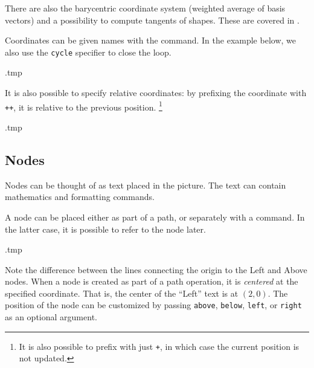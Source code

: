 There are also the barycentric coordinate system (weighted average of basis vectors)
and a possibility to compute tangents of shapes.
These are covered in \cite[Section~13.2]{tikz}.

Coordinates can be given names with the  command.
In the example below, we also use the \verb|cycle| specifier to close the loop.
%
\begin{VerbatimOut}{\jobname.tmp}
\end{VerbatimOut}
\ShowExample

It is also possible to specify relative coordinates:
by prefixing the coordinate with \verb|++|, it is relative to the previous position.%
\footnote{It is also possible to prefix with just \texttt{+},
in which case the current position is not updated.}
%
\begin{VerbatimOut}{\jobname.tmp}
\end{VerbatimOut}
\ShowExample


%
%
\subsection{Nodes}

Nodes can be thought of as text placed in the picture.
The text can contain mathematics and formatting commands.

A node can be placed either as part of a path, or separately with a  command.
In the latter case, it is possible to refer to the node later.
%
\begin{VerbatimOut}{\jobname.tmp}
\end{VerbatimOut}
\ShowExample

Note the difference between the lines connecting the origin to the Left and Above nodes.
When a node is created as part of a path operation,
it is \emph{centered} at the specified coordinate.
That is, the center of the ``Left'' text is at $(2,0)$.
The position of the node can be customized by passing
\verb|above|, \verb|below|, \verb|left|, or \verb|right| as an optional argument.

